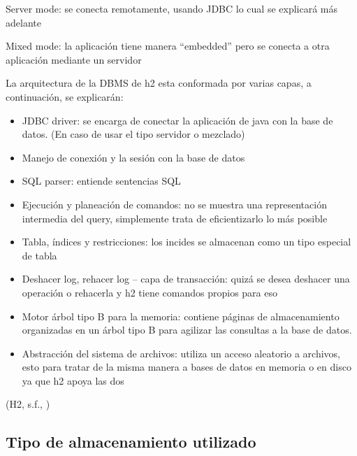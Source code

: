 \documentclass{acmart}
\begin{document}
Server mode: se conecta remotamente, usando JDBC lo cual se explicará más adelante

 



Mixed mode: la aplicación tiene manera “embedded” pero se conecta a otra aplicación mediante un servidor

  





La arquitectura de la DBMS de h2 esta conformada por varias capas, a continuación, se explicarán:

\begin{itemize}

\item JDBC driver: se encarga de conectar la aplicación de java con la base de datos. (En caso de usar el tipo servidor o mezclado)

\item Manejo de conexión y la sesión con la base de datos

\item SQL parser: entiende sentencias SQL

\item Ejecución y planeación de comandos: no se muestra una representación intermedia del query, simplemente trata de eficientizarlo lo más posible

\item Tabla, índices y restricciones: los incides se almacenan como un tipo especial de tabla

\item Deshacer log, rehacer log – capa de transacción: quizá se desea deshacer una operación o rehacerla y h2 tiene comandos propios para eso

\item Motor árbol tipo B para la memoria: contiene páginas de almacenamiento organizadas en un árbol tipo B para agilizar las consultas a la base de datos.

\item Abstracción del sistema de archivos: utiliza un acceso aleatorio a archivos, esto para tratar de la misma manera a bases de datos en memoria o en disco ya que h2 apoya las dos



\end{itemize}

(H2, s.f., \cite{h2features})

\subsection{Tipo de almacenamiento utilizado}
\end{document}
